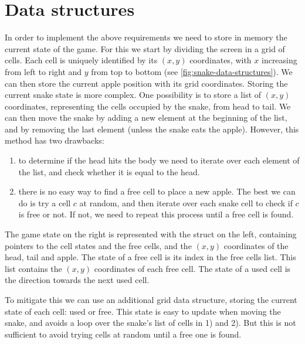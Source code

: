 \section{Data structures}

In order to implement the above requirements we need to store in memory the
current state of the game. For this we start by dividing the screen in a grid
of cells. Each cell is uniquely identified by its $(x,y)$ coordinates, with $x$
increasing from left to right and $y$ from top to bottom (see
\cref{fig:snake-data-structures}). We can then store the current apple position
with its grid coordinates. Storing the current snake state is more complex. One
possibility is to store a list of $(x,y)$ coordinates, representing the cells
occupied by the snake, from head to tail. We can then move the snake by adding
a new element at the beginning of the list, and by removing the last element
(unless the snake eats the apple). However, this method has two drawbacks:
\begin{enumerate}
  \item to determine if the head hits the body we need to iterate over each
  element of the list, and check whether it is equal to the head.

  \item there is no easy way to find a free cell to place a new apple. The best
  we can do is try a cell $c$ at random, and then iterate over each snake cell
  to check if $c$ is free or not. If not, we need to repeat this process until
  a free cell is found.
\end{enumerate}

\begin{Figure}
  

  \caption{The game state on the right is represented with the struct on the
  left, containing pointers to the cell states and the free cells, and the
  $(x,y)$ coordinates of the head, tail and apple. The state of a free cell is
  its index in the free cells list. This list contains the $(x,y)$ coordinates
  of each free cell. The state of a used cell is the direction towards the next
  used cell.}\label{fig:snake-data-structures}
\end{Figure}

To mitigate this we can use an additional grid data structure, storing the
current state of each cell: used or free. This state is easy to update when
moving the snake, and avoids a loop over the snake's list of cells in 1) and
2). But this is not sufficient to avoid trying cells at random until a free one
is found.

